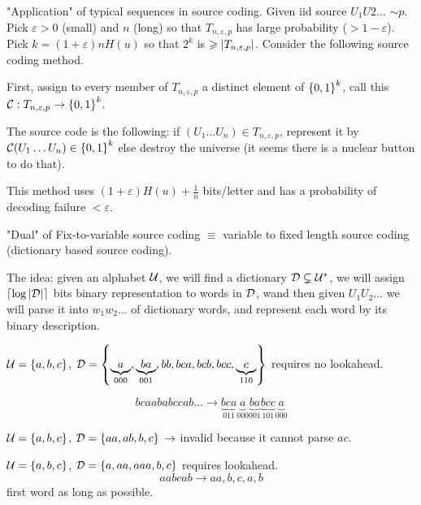 \bigskip

"Application" of typical sequences in source coding. Given iid source $U_1U2\ldots$ $\sim p$. Pick $\varepsilon > 0$ (small) and $n$ (long) so that $T_{n,\varepsilon, p}$ has large probability ($>1-\varepsilon$). Pick $k = (1+\varepsilon)nH(u)$ so that $2^k$ is $\geqslant \left\lvert T_{n,\varepsilon, p}\right\rvert$. Consider the following source coding method.

First, assign to every member of $T_{n,\varepsilon,p}$ a distinct element of $\left\{ 0,1 \right\}^k$, call this $\mathcal{C} : T_{n,\varepsilon,p} \to \left\{ 0,1 \right\}^k$.

The source code is the following: if $(U_1\ldots U_n)\in T_{n,\varepsilon,p}$, represent it by $\mathcal{C}(U_1\ldots U_n)\in\left\{ 0,1 \right\}^k$ else destroy the universe (it seems there is a nuclear button to do that).

This method uses $(1+\varepsilon) H(u) + \frac{1}{n}$ bits/letter and has a probability of decoding failure $< \varepsilon$.


\bigskip

"Dual" of Fix-to-variable source coding $\equiv$ variable to fixed length source coding (dictionary based source coding).

The idea: given an alphabet $\mathcal{U}$, we will find a dictionary $\mathcal{D} \subsetneq \mathcal{U}^*$, we will assign $\left\lceil \log\left\lvert\mathcal{D}\right\rvert \right\rceil$ bits binary representation to words in $\mathcal{D}$, wand then given $U_1U_2\ldots$ we will parse it into $w_1w_2\ldots$ of dictionary words, and represent each word by its binary description.

\begin{example}\label{codes_fixed_to_fixed:ex:1}
    $\mathcal{U} = \left\{ a,b,c \right\}$, $\mathcal{D} = \left\{ \underbrace{a}_{000},\underbrace{ba}_{001},bb,bca,bcb,bcc,\underbrace{c}_{110} \right\}$ requires no lookahead.
    
    \[
        bcaababccab\ldots \to \underbrace{bca}_{011} \underbrace{a}_{000} \underbrace{ba}_{001}\underbrace{bcc}_{101}\underbrace{a}_{000}
    \]
\end{example}

\begin{example}\label{codes_fixed_to_fixed:ex:2}
    $\mathcal{U} = \left\{ a,b,c \right\}$, $\mathcal{D}=\left\{ aa,ab,b,c \right\}$ $\rightarrow$ invalid because it cannot parse $ac$.
\end{example}

\begin{example}\label{codes_fixed_to_fixed:ex:3}
    $\mathcal{U} = \left\{ a,b,c \right\}$, $\mathcal{D}=\left\{ a,aa,aaa,b,c \right\}$ requires lookahead.
    \[
        aabcab \to aa,b,c,a,b    
    \]
    first word as long as possible.
\end{example}

